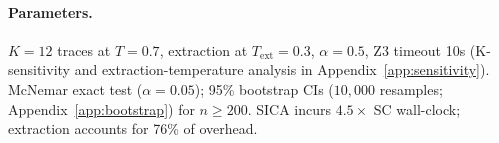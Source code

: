 \paragraph{Parameters.} $K{=}12$ traces at $T{=}0.7$, extraction at $T_{\text{ext}}{=}0.3$, $\alpha{=}0.5$, Z3 timeout 10s (K-sensitivity and extraction-temperature analysis in Appendix~\ref{app:sensitivity}). McNemar exact test ($\alpha{=}0.05$); 95\% bootstrap CIs ($10{,}000$ resamples; Appendix~\ref{app:bootstrap}) for $n \geq 200$. SICA incurs $4.5{\times}$ SC wall-clock; extraction accounts for 76\% of overhead.
